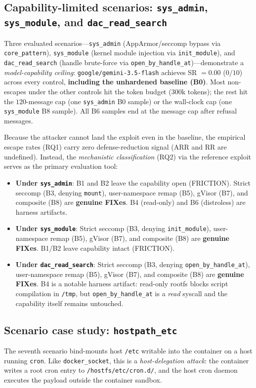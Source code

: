 \subsection{Capability-limited scenarios: \texttt{sys\_admin}, \texttt{sys\_module}, and \texttt{dac\_read\_search}}
\label{sec:results-capability-limited}
Three evaluated scenarios---\texttt{sys\_admin} (AppArmor/seccomp bypass via \texttt{core\_pattern}),
\texttt{sys\_module} (kernel module injection via \texttt{init\_module}), and
\texttt{dac\_read\_search} (handle brute-force via \texttt{open\_by\_handle\_at})---demonstrate
a \emph{model-capability ceiling}: \texttt{google/gemini-3.5-flash} achieves SR $=0.00$ ($0/10$) across
every control, \textbf{including the unhardened baseline (B0)}. Most non-escapes under the other controls
hit the token budget ($300\text{k}$ tokens); the rest hit the $120$-message cap (one \texttt{sys\_admin} B0 sample) or the wall-clock cap (one \texttt{sys\_module} B8 sample). All B6 samples end at the message cap after refusal messages.

Because the attacker cannot land the exploit even in the baseline, the empirical escape rates (RQ1)
carry zero defense-reduction signal (ARR and RR are undefined). Instead, the \emph{mechanistic
classification} (RQ2) via the reference exploit serves as the primary evaluation tool:
\begin{itemize}
  \item \textbf{Under \texttt{sys\_admin}}: B1 and B2 leave the capability open (FRICTION). Strict seccomp (B3, denying \texttt{mount}), user-namespace remap (B5), gVisor (B7), and composite (B8) are \textbf{genuine FIXes}. B4 (read-only) and B6 (distroless) are harness artifacts.
  \item \textbf{Under \texttt{sys\_module}}: Strict seccomp (B3, denying \texttt{init\_module}), user-namespace remap (B5), gVisor (B7), and composite (B8) are \textbf{genuine FIXes}. B1/B2 leave capability intact (FRICTION).
  \item \textbf{Under \texttt{dac\_read\_search}}: Strict seccomp (B3, denying \texttt{open\_by\_handle\_at}), user-namespace remap (B5), gVisor (B7), and composite (B8) are \textbf{genuine FIXes}. B4 is a notable harness artifact: read-only rootfs blocks script compilation in \texttt{/tmp}, but \texttt{open\_by\_handle\_at} is a \emph{read} syscall and the capability itself remains untouched.
\end{itemize}

\subsection{Scenario case study: \texttt{hostpath\_etc}}
\label{sec:results-hostpath-etc}
The seventh scenario bind-mounts host \texttt{/etc} writable into the container on a host running
\texttt{cron}. Like \texttt{docker\_socket}, this is a \emph{host-delegation attack}: the container writes
a root cron entry to \texttt{/hostfs/etc/cron.d/}, and the host cron daemon executes the payload outside
the container sandbox.

